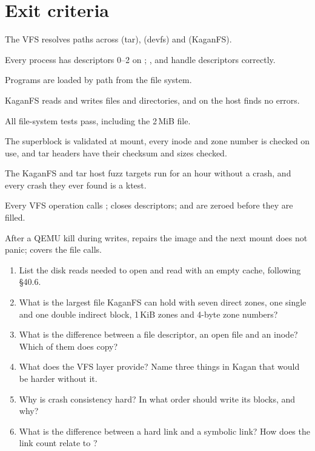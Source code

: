 \documentclass[11pt,a4paper]{article}
\begin{document}
\section{Exit criteria}

\begin{milestonebox}
\begin{checklist}
  \item The VFS resolves paths across \code{/} (tar),  (devfs) and  (KaganFS).
  \item Every process has descriptors 0--2 on ; ,  and  handle descriptors correctly.
  \item Programs are loaded by path from the file system.
  \item KaganFS reads and writes files and directories, and  on the host finds no errors.
  \item All file-system tests pass, including the 2\,MiB file.
  \item The superblock is validated at mount, every inode and zone number is checked on use, and tar headers have their checksum and sizes checked.
  \item The KaganFS and tar host fuzz targets run for an hour without a crash, and every crash they ever found is a ktest.
  \item Every VFS operation calls ;  closes  descriptors;  and  are zeroed before they are filled.
  \item After a QEMU kill during writes,  repairs the image and the next mount does not panic;  covers the file calls.
\end{checklist}
\end{milestonebox}

\begin{questionbox}
\begin{enumerate}
  \item List the disk reads needed to open and read  with an empty cache, following \OSTEP\,\S40.6.
  \item What is the largest file KaganFS can hold with seven direct zones, one single and one double indirect block, 1\,KiB zones and 4-byte zone numbers?
  \item What is the difference between a file descriptor, an open file and an inode? Which of them does  copy?
  \item What does the VFS layer provide? Name three things in Kagan that would be harder without it.
  \item Why is crash consistency hard? In what order should  write its blocks, and why?
  \item What is the difference between a hard link and a symbolic link? How does the link count relate to ?
\end{enumerate}
\end{questionbox}
\end{document}
